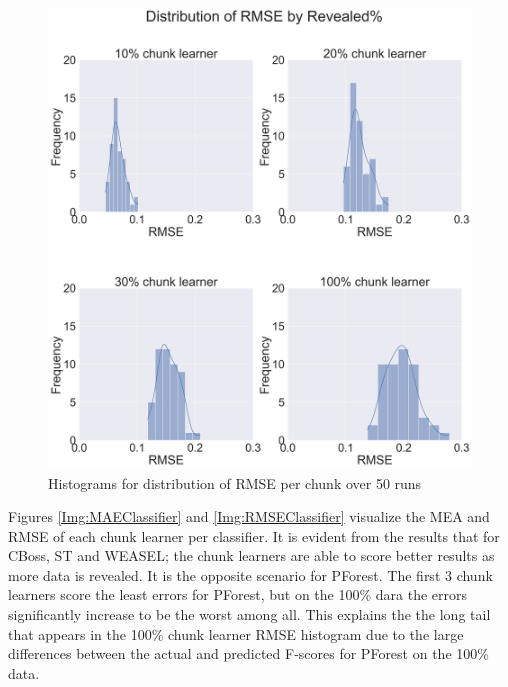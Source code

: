   \begin{figure}[hp!]
    \captionsetup{justification=raggedright}
    \centering
    \includegraphics[width=\textwidth]{hist_rmse.jpg}
    \centering
    \caption{Histograms for distribution of RMSE per chunk over 50 runs}
    \label{Img:HistogramRMSE}
  \end{figure}

Figures \ref{Img:MAEClassifier} and \ref{Img:RMSEClassifier} visualize the MEA and RMSE of each chunk learner per classifier.
It is evident from the results that for CBoss, ST and WEASEL; the chunk learners are able to score better results as more data is revealed.
It is the opposite scenario for PForest. The first 3 chunk learners score the least errors for PForest, but on the 100\% dara the errors significantly increase to be the worst among all.
This explains the the long tail that appears in the 100\% chunk learner RMSE histogram due to the large differences between the actual and predicted F-scores for PForest on the 100\% data.

